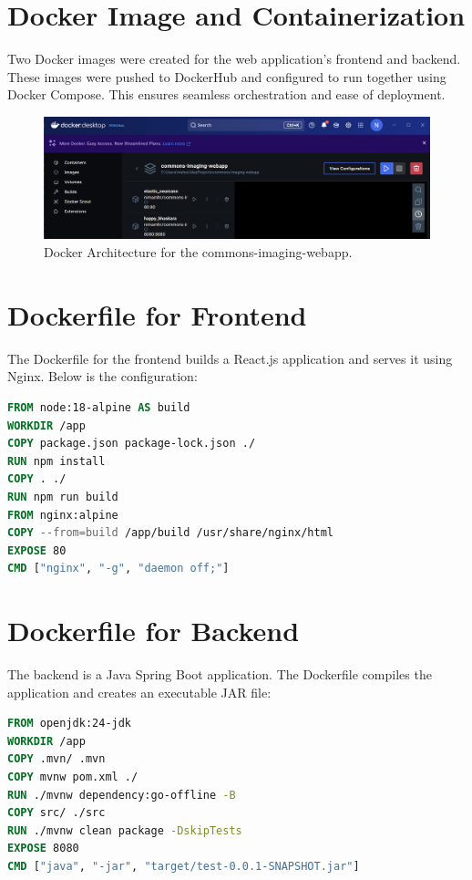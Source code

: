 \documentclass[a4paper,12pt]{report}
\begin{document}
\section{Docker Image and Containerization}
Two Docker images were created for the web application's frontend and backend. These images were pushed to DockerHub and configured to run together using Docker Compose. This ensures seamless orchestration and ease of deployment.

\begin{figure}[H]
    \centering
    \includegraphics[width=1\textwidth]{Report_Img/docker_desktop.png}
    \caption{Docker Architecture for the commons-imaging-webapp.}
    \label{fig:docker_architecture}
\end{figure}

\section{Dockerfile for Frontend}
The Dockerfile for the frontend builds a React.js application and serves it using Nginx. Below is the configuration:

\begin{lstlisting}[language=dockerfile, caption=Dockerfile for commons-imaging-webapp Frontend]
FROM node:18-alpine AS build
WORKDIR /app
COPY package.json package-lock.json ./
RUN npm install
COPY . ./
RUN npm run build
FROM nginx:alpine
COPY --from=build /app/build /usr/share/nginx/html
EXPOSE 80
CMD ["nginx", "-g", "daemon off;"]
\end{lstlisting}

\section{Dockerfile for Backend}
The backend is a Java Spring Boot application. The Dockerfile compiles the application and creates an executable JAR file:

\begin{lstlisting}[language=dockerfile, caption=Dockerfile for commons-imaging-webapp Backend]
FROM openjdk:24-jdk
WORKDIR /app
COPY .mvn/ .mvn
COPY mvnw pom.xml ./
RUN ./mvnw dependency:go-offline -B
COPY src/ ./src
RUN ./mvnw clean package -DskipTests
EXPOSE 8080
CMD ["java", "-jar", "target/test-0.0.1-SNAPSHOT.jar"]
\end{lstlisting}
\end{document}
